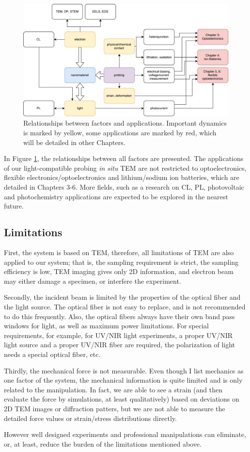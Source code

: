 \begin{figure}  
\includegraphics[width=\textwidth]{figures/figure2_apply}
\caption[Relationships between factors and applications.]{Relationships between factors and applications. Important dynamics is marked by yellow, some applications are marked by red, which will be detailed in other Chapters.
\label{fig:2_apply}}
\end{figure}

In Figure \ref{fig:2_apply}, the relationships between all factors are presented. The applications of our light-compatible probing {\em in situ} TEM are not restricted to optoelectronics, flexible electronics/optoelectronics and lithium/sodium ion batteries, which are detailed in Chapters 3-6. More fields, such as a research on CL, PL, photovoltaic and photochemistry applications are expected to be explored in the nearest future. 

\subsection{Limitations}
First, the system is based on TEM, therefore, all limitations of TEM are also applied to our system; that is, the sampling requirement is strict, the sampling efficiency is low, TEM imaging gives only 2D information, and electron beam may either damage a specimen, or interfere the experiment. 

Secondly, the incident beam is limited by the properties of the optical fiber and the light source. The optical fiber is not easy to replace, and is not recommended to do this frequently. 
Also, the optical fibers always have their own band pass windows for light, as well as maximum power limitations. 
For special requirements, for example, for UV/NIR light experiments, a proper UV/NIR light source and a proper UV/NIR fiber are required, the polarization of light needs a special optical fiber, etc. 

Thirdly, the mechanical force is not measurable. Even though I list mechanics as one factor of the system, the mechanical information is quite limited and is only related to the manipulation. In fact, we are able to see a strain (and then evaluate the force by simulations, at least qualitatively) based on deviations on 2D TEM images or diffraction patters, but we are not able to measure the detailed force values or strain/stress distributions directly. 

However well designed experiments and professional manipulations can eliminate, or, at least, reduce the burden of the limitations mentioned above. 
